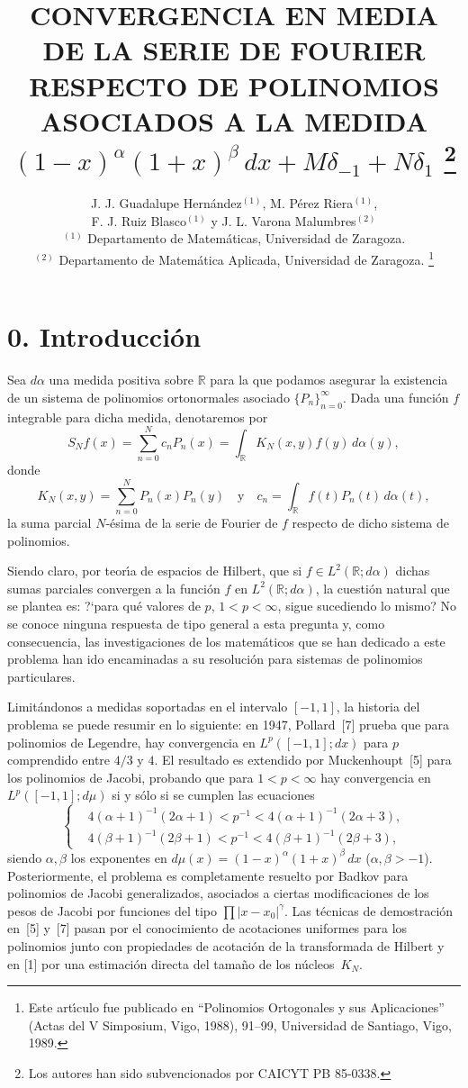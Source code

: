 \documentclass[a4paper,12pt]{article}
\date{}
\title{\large \bfseries \boldmath CONVERGENCIA EN MEDIA DE LA
SERIE DE FOURIER RESPECTO DE POLINOMIOS ASOCIADOS A LA MEDIDA
$(1-x)^{\alpha} (1+x)^{\beta}\,dx + M \delta_{-1} + N \delta_{1}$
\thanks{Los autores han sido subvencionados por CAICYT PB 85-0338.}}
\author{%
J. J. Guadalupe Hern\'andez$^{(1)}$, M. P\'erez Riera$^{(1)}$,\\[2pt]
F. J. Ruiz Blasco$^{(1)}$ y J. L. Varona Malumbres$^{(2)}$\\[12pt]
\small $^{(1)}$ Departamento de Matem\'aticas,
Universidad de Zaragoza.\\
\small $^{(2)}$ Departamento de Matem\'atica Aplicada,
Universidad de Zaragoza.%
\renewcommand\footnotemark{}%
\footnote{Este art\'{\i}culo fue publicado en
``Polinomios Ortogonales y sus Aplicaciones''
(Actas del V Simposium, Vigo, 1988),
91--99, Universidad de Santiago, Vigo, 1989.}%
}
\theoremstyle{plain}
\theoremstyle{definition}
\newcommand{\parrafo}[1]{\section*{\large #1}}
\newcommand{\R}{\mathbb{R}}
\begin{document}
\maketitle

\parrafo{0. Introducci\'on}

Sea $d\alpha$ una medida positiva sobre $\R$ para la que podamos
asegurar la existencia de un sistema de polinomios ortonormales
asociado $\{P_{n}\}_{n=0}^{\infty}$. Dada una funci\'on $f$ integrable
para dicha medida, denotaremos por
$$
S_{N}f(x) = \sum_{n=0}^{N} c_{n}P_{n}(x)
= \int_{\R} K_{N}(x,y)f(y)\,d\alpha(y),
$$
donde
$$
K_{N}(x,y) = \sum_{n=0}^{N} P_{n}(x)P_{n}(y)
\quad\text{y}\quad
c_{n} = \int_{\R} f(t)P_{n}(t)\,d\alpha(t),
$$
la suma parcial $N$-\'esima de la serie de Fourier de $f$
respecto de dicho sistema de polinomios.

Siendo claro, por teor\'{\i}a de espacios de Hilbert, que si
$f \in L^{2}(\R;d\alpha)$ dichas sumas parciales convergen
a la funci\'on $f$ en $L^{2}(\R;d\alpha)$, la cuesti\'on natural
que se plantea es: ?`para qu\'e valores de $p$, $1 < p < \infty$,
sigue sucediendo lo mismo? No se conoce ninguna respuesta de
tipo general a esta pregunta y, como consecuencia, las investigaciones
de los matem\'aticos que se han dedicado a este problema han
ido encaminadas a su resoluci\'on para sistemas de polinomios
particulares.

Limit\'andonos a medidas soportadas en el intervalo $[-1,1]$, la
historia del problema se puede resumir en lo siguiente: en 1947,
Pollard~[7] prueba que para polinomios de Legendre, hay convergencia
en $L^{p}([-1,1];dx)$ para $p$ comprendido entre $4/3$ y $4$. El resultado
es extendido por Muckenhoupt~[5] para los polinomios de Jacobi,
probando que para $1 < p < \infty$ hay
convergencia en $L^{p}([-1,1];d\mu)$ si y s\'olo si se cumplen
las ecuaciones
\begin{equation}
\left\{
\begin{aligned}
&4(\alpha+1)^{-1}(2\alpha+1) < p^{-1} < 4(\alpha+1)^{-1}(2\alpha+3),\\
&4(\beta+1)^{-1}(2\beta+1) < p^{-1} < 4(\beta+1)^{-1}(2\beta+3),
\end{aligned}
\right.
\tag{$*$}
\end{equation}
siendo $\alpha,\beta$ los exponentes en $d\mu(x) =
(1-x)^{\alpha}(1+x)^{\beta}\,dx$ ($\alpha,\beta>-1$).
Posteriormente, el problema es completamente resuelto por Badkov
para polinomios de Jacobi generalizados, asociados a ciertas
modificaciones de los pesos de Jacobi por funciones del tipo
$\prod|x-x_{0}|^{\gamma}$. Las t\'ecnicas de demostraci\'on
en~[5] y~[7] pasan por el conocimiento de acotaciones uniformes
para los polinomios junto con propiedades de acotaci\'on de la
transformada de Hilbert y en [1] por una estimaci\'on directa
del tama\~no de los n\'ucleos~$K_{N}$.
\end{document}

